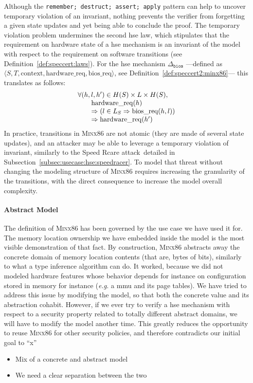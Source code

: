 \documentclass[oneside,a4paper]{memoir}
\theoremstyle{break}
\begin{document}
Although the \texttt{remember;~destruct;~assert;~apply} pattern can help to
uncover temporary violation of an invariant, nothing prevents the verifier from
forgetting a given state updates and yet being able to conclude the proof.
%
The temporary violation problem undermines the second \ac{hse} law, which
stipulates that the requirement on hardware state of a \ac{hse} mechanism is an
invariant of the model with respect to the requirement on software transitions
(see Definition~\ref{def:speccert:laws}).
%
For the \ac{hse} mechanism \( \Delta_{\mathtt{bios}} \) ---defined as
\( \langle S, T, \mathrm{context}, \mathrm{hardware\_req}, \mathrm{bios\_req}
\rangle \), see Definition~\ref{def:speccert2:minx86}--- this translates as
follows:
%
\[
  \begin{array}{l}
    \forall (h, l, h') \in H(S) \times L \times H(S), \\
    \qquad\mathrm{hardware\_req}(h) \\
    \qquad\Rightarrow (l \in L_S \Rightarrow \mathrm{bios\_req}(h, l)) \\
    \qquad\Rightarrow \mathrm{hardware\_req}(h')
  \end{array}
\]
%
In practice, transitions in {\scshape Minx86} are not atomic (they are made of
several state updates), and an attacker may be able to leverage a temporary
violation of invariant, similarly to the Speed Rcare
attack\,\cite{kallenberg2015racecondition} detailed in
Subsection~\ref{subsec:usecase:hse:speedracer}.
%
To model that threat without changing the modeling structure of {\scshape
  Minx86} requires increasing the granularity of the transitions, with the
direct consequence to increase the model overall complexity.

\paragraph{Abstract Model}
%
The definition of {\scshape Minx86} has been governed by the use case we have
used it for.
%
The memory location ownership we have embedded inside the model is the most
visible demonstration of that fact.
%
By construction, {\scshape Minx86} abstracts away the concrete domain of memory
location contents (that are, bytes of bits), similarly to what a type inference
algorithm can do.
%
It worked, because we did not modeled hardware features whose behavior depends
for instance on configuration stored in memory for instance (\emph{e.g.} a
\ac{mmu} and its page tables).
%
We have tried to address this issue by modifying the model, so that both the
concrete value and its abstraction cohabit.
%
However, if we ever try to verify a \ac{hse} mechanism with respect to a
security property related to totally different abstract domains, we will have to
modify the model another time.
%
This greatly reduces the opportunity to reuse {\scshape Minx86} for other
security policies, and therefore contradicts our initial goal to ``x''
%

\begin{itemize}
\item Mix of a concrete and abstract model
\item We need a clear separation between the two
\end{itemize}

%

\end{document}

